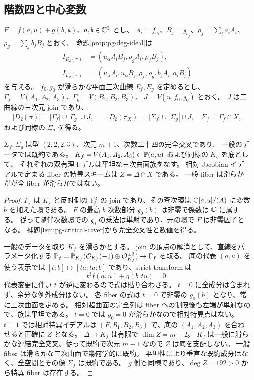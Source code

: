 \subsection{階数四と中心変数}
$F=f(a,u)+g(b,u)$、$a,b\in\mathbb C^3$ とし、
$A_i=f_{a_i}$、$B_j=g_{b_j}$、$\rho_f=\sum_i a_iA_i$、$\rho_g=\sum_jb_jB_j$ とおく。
命題\ref{prop:pg-deg-ideal}は
\begin{align*}
I_{D_2(\pi)}&=(u_\alpha A_iB_j,\rho_gA_i,\rho_fB_j),\\
I_{D_0(\pi)}&=(u_\alpha A_i,u_\alpha B_j,\rho_f,\rho_g,b_jA_i,a_iB_j)
\end{align*}
を与える。
$f_0,g_0$ が滑らかな平面三次曲線 $E_f,E_g$ を定めるとし、
$\Gamma_f=V(A_1,A_2,A_3)$、$\Gamma_g=V(B_1,B_2,B_3)$、
$J=V(u,f_0,g_0)$ とおく。
$J$ は二曲線の三次元 join であり、
\[
|D_2(\pi)|=|\Gamma_f|\cup|\Gamma_g|\cup J,
\qquad |D_2(\pi_X)|=|\Sigma_f|\cup|\Sigma_g|\cup J,
\quad\Sigma_f=\Gamma_f\cap X,
\]
および同様の $\Sigma_g$ を得る。
\begin{proposition}\label{prop:pg-cubic-surface-family}
$\Sigma_f,\Sigma_g$ は型 $(2,2,2,3)$、次元 $m+1$、次数二十四の完全交叉であり、
一般のデータでは既約である。
$K_f=V(A_1,A_2,A_3)\subset\mathbb P(a,u)$ および同様の $K_g$ を底として、
それぞれの双有理モデルは平坦な三次曲面族をなす。
相対 Jacobian イデアルで定まる fiber の特異スキームは $Z=\Delta\cap X$ である。
一般 fiber は滑らかだが全 fiber が滑らかではない。
\end{proposition}
\begin{proof}
$\Gamma_f$ は $K_f$ と反対側の $\mathbb P_b^2$ の join であり、その斉次環は
$\mathbb C[a,u]/(A)$ に変数 $b$ を加えた環である。
$F$ の最高 $b$ 次数部分 $g_0(b)$ は非零で係数は $\mathbb C$ に属する。
従って随伴次数環での $g_0$ の乗法は単射であり、元の環で $F$ は非零因子となる。
補題\ref{lem:pg-critical-cover}から完全交叉性と数値を得る。

一般のデータを取り $K_f$ を滑らかとする。
join の頂点の解消として、直線をパラメータ化する
$\mathbb P_f=\mathbb P_{K_f}(\mathcal O_{K_f}(-1)\oplus\mathcal O_{K_f}^{\oplus3})\to\Gamma_f$ を取る。
底の代表 $(a,u)$ を使う表示では $[t:b]\mapsto[ta:tu:b]$ であり、strict transform は
\begin{equation}
t^3f(a,u)+g(b,tu)=0.\label{eq:pg-surface-fiber}
\end{equation}
代表変更に伴い $t$ が逆に変わるので式は貼り合わさる。
$t=0$ に全成分は含まれず、余分な例外成分はない。
各 fiber の式は $t=0$ で非零の $g_0(b)$ となり、常に三次曲面を定める。
相対超曲面の完全列は fiber への制限後も左端が単射なので、族は平坦である。
$t=0$ では $g_0=0$ が滑らかなので相対特異点はない。
$t=1$ では相対特異イデアルは $(F,B_1,B_2,B_3)$ で、底の $(A_1,A_2,A_3)$ を合わせると正確に $Z$ となる。
$\Delta\to K_f$ は有限で $\dim Z=m-2$。
$K_f$ は一般に滑らかな連結完全交叉、従って既約で次元 $m-1$ なので $Z$ は底を支配しない。
一般 fiber は滑らかな三次曲面で幾何学的に既約。
平坦性により垂直な既約成分はなく、全空間とその像 $\Sigma_f$ は既約である。
$g$ 側も同様であり、$\deg Z=192>0$ から特異 fiber は存在する。
\end{proof}
